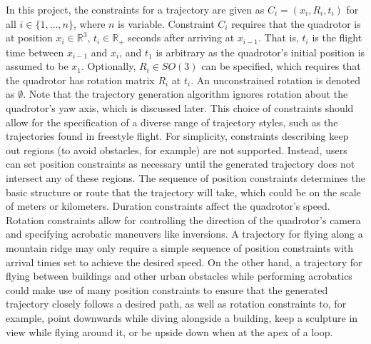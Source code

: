 \documentclass[pageno]{jpaper}
\begin{document}
In this project, the constraints for a trajectory are given as $C_i = (x_i, R_i, t_i)$ for all $i \in \{1, \dots, n\}$, where $n$ is variable. Constraint $C_i$ requires that the quadrotor is at position $x_i \in \mathbb{R}^3$, $t_i \in \mathbb{R}_+$ seconds after arriving at $x_{i-1}$. That is, $t_i$ is the flight time between $x_{i-1}$ and $x_i$, and $t_1$ is arbitrary as the quadrotor's initial position is assumed to be $x_1$. Optionally, $R_i \in SO(3)$ can be specified, which requires that the quadrotor has rotation matrix $R_i$ at $t_i$. An unconstrained rotation is denoted as $\emptyset$. Note that the trajectory generation algorithm ignores rotation about the quadrotor's yaw axis, which is discussed later. This choice of constraints should allow for the specification of a diverse range of trajectory styles, such as the trajectories found in freestyle flight. For simplicity, constraints describing keep out regions (to avoid obstacles, for example) are not supported. Instead, users can set position constraints as necessary until the generated trajectory does not intersect any of these regions. The sequence of position constraints determines the basic structure or route that the trajectory will take, which could be on the scale of meters or kilometers. Duration constraints affect the quadrotor's speed. Rotation constraints allow for controlling the direction of the quadrotor's camera and specifying acrobatic maneuvers like inversions. A trajectory for flying along a mountain ridge may only require a simple sequence of position constraints with arrival times set to achieve the desired speed. On the other hand, a trajectory for flying between buildings and other urban obstacles while performing acrobatics could make use of many position constraints to ensure that the generated trajectory closely follows a desired path, as well as rotation constraints to, for example, point downwards while diving alongside a building, keep a sculpture in view while flying around it, or be upside down when at the apex of a loop.
\end{document}

